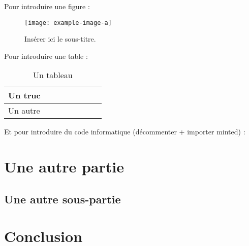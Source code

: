 \documentclass[a4paper,12pt,french]{article}
\begin{document}
Pour introduire une figure : 

\begin{figure}[ht!]
    \centering
    \texttt{[image: example-image-a]}
    \caption{Insérer ici le sous-titre.}
    \label{fig:}
\end{figure}




Pour introduire une table : 

\begin{table}[ht!]
\begin{center}
\begin{tabular}{@{}llllllll@{}}
\toprule
Un truc &  &  &  &  &  &  &  \\ \midrule
Un autre &  &  &  &  &  &  & \\ \bottomrule
\end{tabular}
\caption{Un tableau \label{tab:id-de-la-table}}
\end{center}
\end{table}



Et pour introduire du code informatique (décommenter + importer minted) :




\section{Une autre partie}
\subsection{Une autre sous-partie}
\lipsum[2]




\section{Conclusion}
\lipsum[3]
\end{document}
